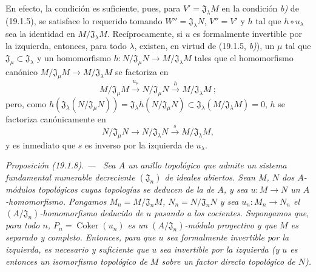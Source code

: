 \documentclass[10pt,oneside]{book}
\makeatletter
\newcommand{\setmanualcurrentlabel}[1]{\def\@currentlabel{#1}}
\newcommand{\oldpage}[2][]{%
  \setcounter{footnote}{0}%
  \marginpar{\scriptsize\textbf{#1}~|~#2}\ignorespaces}
\newenvironment{proposition}[1][]{%
  \setmanualcurrentlabel{#1}\par\medskip\noindent\itshape Proposición (#1). ---\ }{\par}
\makeatother
\begin{document}
En efecto, la condición es suficiente, pues, para
$V'=\mathfrak J_\lambda M$ en la condición \emph{b)} de (19.1.5), se satisface lo
requerido tomando $W''=\mathfrak J_\lambda N$, $V''=V'$ y $h$ tal que
$h\circ u_\lambda$ sea la identidad en $M/\mathfrak J_\lambda M$.
Recíprocamente, si $u$ es formalmente invertible por la izquierda, entonces, para todo
$\lambda$, existen, en virtud de (19.1.5, \emph{b)}), un $\mu$ tal que
$\mathfrak J_\mu\subset\mathfrak J_\lambda$ y un homomorfismo
$h:N/\mathfrak J_\mu N\to M/\mathfrak J_\lambda M$ tales que el homomorfismo
canónico $M/\mathfrak J_\mu M\to M/\mathfrak J_\lambda M$ se factoriza en
\[
  M/\mathfrak J_\mu M\xrightarrow{u_\mu}N/\mathfrak J_\mu N
  \xrightarrow{h}M/\mathfrak J_\lambda M~;
\]
pero, como
$h(\mathfrak J_\lambda(N/\mathfrak J_\mu N))=\mathfrak J_\lambda h(N/\mathfrak J_\mu N)
\subset\mathfrak J_\lambda(M/\mathfrak J_\lambda M)=0$, $h$ se factoriza
canónicamente en
\[
  N/\mathfrak J_\mu N\longrightarrow N/\mathfrak J_\lambda N
  \xrightarrow{s}M/\mathfrak J_\lambda M,
\]
y es inmediato que $s$ es inverso por la izquierda de $u_\lambda$.

\begin{proposition}[19.1.8]
\label{0.19.1.8-es}
Sea $A$ un anillo topológico que admite un sistema fundamental numerable
decreciente $(\mathfrak J_n)$ de ideales abiertos. Sean $M$, $N$ dos
$A$-módulos topológicos cuyas topologías se deducen de la de $A$,
y sea $u:M\to N$ un $A$-homomorfismo. Pongamos
$M_n=M/\mathfrak J_nM$, $N_n=N/\mathfrak J_nN$ y sea
$u_n:M_n\to N_n$ el $(A/\mathfrak J_n)$-homomorfismo deducido de $u$
pasando a los cocientes. Supongamos que, para todo $n$,
$P_n=\operatorname{Coker}(u_n)$ es un $(A/\mathfrak J_n)$-módulo proyectivo
y que $M$ es separado y completo. Entonces, para que $u$ sea formalmente
invertible por la izquierda, es necesario y suficiente que $u$ sea invertible por la izquierda \textup{(y
$u$ es entonces un isomorfismo topológico de $M$ sobre un factor directo
topológico de $N$)}.
\end{proposition}

\oldpage[0\textsubscript{IV-1}]{74}
\end{document}
